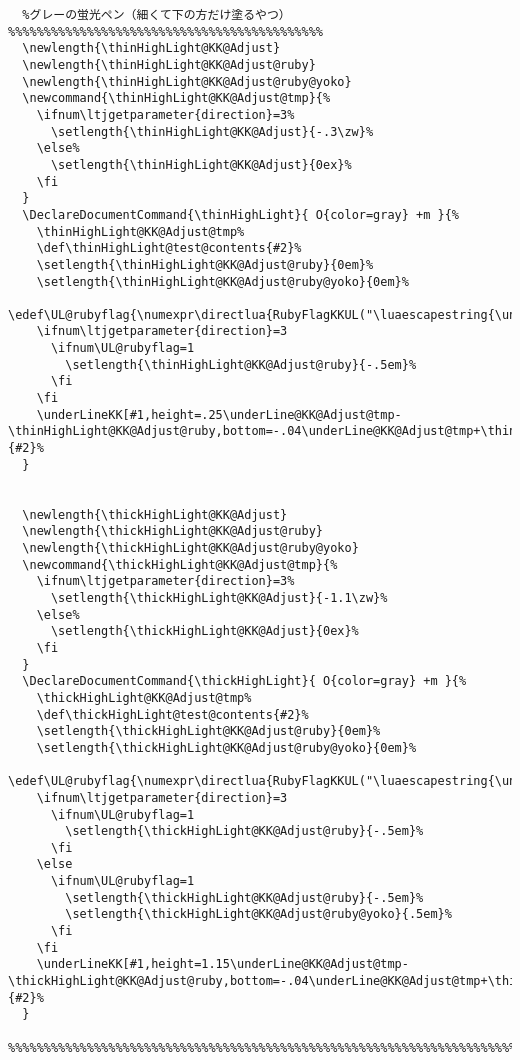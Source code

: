 \documentclass[luatex,fontsize=8pt,paper=b5,twoside]{jlreq}%
\begin{document}
\begin{lstlisting}
  %グレーの蛍光ペン（細くて下の方だけ塗るやつ）%%%%%%%%%%%%%%%%%%%%%%%%%%%%%%%%%%%%%%%%%%%%
  \newlength{\thinHighLight@KK@Adjust}
  \newlength{\thinHighLight@KK@Adjust@ruby}
  \newlength{\thinHighLight@KK@Adjust@ruby@yoko}
  \newcommand{\thinHighLight@KK@Adjust@tmp}{%
    \ifnum\ltjgetparameter{direction}=3%
      \setlength{\thinHighLight@KK@Adjust}{-.3\zw}%
    \else%
      \setlength{\thinHighLight@KK@Adjust}{0ex}%
    \fi
  }
  \DeclareDocumentCommand{\thinHighLight}{ O{color=gray} +m }{%
    \thinHighLight@KK@Adjust@tmp%
    \def\thinHighLight@test@contents{#2}%
    \setlength{\thinHighLight@KK@Adjust@ruby}{0em}%
    \setlength{\thinHighLight@KK@Adjust@ruby@yoko}{0em}%
    \edef\UL@rubyflag{\numexpr\directlua{RubyFlagKKUL("\luaescapestring{\unexpanded\expandafter{\thinHighLight@test@contents}}")}\relax}%
    \ifnum\ltjgetparameter{direction}=3
      \ifnum\UL@rubyflag=1
        \setlength{\thinHighLight@KK@Adjust@ruby}{-.5em}%
      \fi
    \fi
    \underLineKK[#1,height=.25\underLine@KK@Adjust@tmp-\thinHighLight@KK@Adjust@ruby,bottom=-.04\underLine@KK@Adjust@tmp+\thinHighLight@KK@Adjust+\thinHighLight@KK@Adjust@ruby]{#2}%
  }


  \newlength{\thickHighLight@KK@Adjust}
  \newlength{\thickHighLight@KK@Adjust@ruby}
  \newlength{\thickHighLight@KK@Adjust@ruby@yoko}
  \newcommand{\thickHighLight@KK@Adjust@tmp}{%
    \ifnum\ltjgetparameter{direction}=3%
      \setlength{\thickHighLight@KK@Adjust}{-1.1\zw}%
    \else%
      \setlength{\thickHighLight@KK@Adjust}{0ex}%
    \fi
  }
  \DeclareDocumentCommand{\thickHighLight}{ O{color=gray} +m }{%
    \thickHighLight@KK@Adjust@tmp%
    \def\thickHighLight@test@contents{#2}%
    \setlength{\thickHighLight@KK@Adjust@ruby}{0em}%
    \setlength{\thickHighLight@KK@Adjust@ruby@yoko}{0em}%
    \edef\UL@rubyflag{\numexpr\directlua{RubyFlagKKUL("\luaescapestring{\unexpanded\expandafter{\thickHighLight@test@contents}}")}\relax}%
    \ifnum\ltjgetparameter{direction}=3
      \ifnum\UL@rubyflag=1
        \setlength{\thickHighLight@KK@Adjust@ruby}{-.5em}%
      \fi
    \else
      \ifnum\UL@rubyflag=1
        \setlength{\thickHighLight@KK@Adjust@ruby}{-.5em}%
        \setlength{\thickHighLight@KK@Adjust@ruby@yoko}{.5em}%
      \fi
    \fi
    \underLineKK[#1,height=1.15\underLine@KK@Adjust@tmp-\thickHighLight@KK@Adjust@ruby,bottom=-.04\underLine@KK@Adjust@tmp+\thickHighLight@KK@Adjust+\thickHighLight@KK@Adjust@ruby+\thickHighLight@KK@Adjust@ruby@yoko]{#2}%
  }
  %%%%%%%%%%%%%%%%%%%%%%%%%%%%%%%%%%%%%%%%%%%%%%%%%%%%%%%%%%%%%%%%%%%%%%%%%%%%%%%%%%%%%%%%%



\end{lstlisting}
\end{document}
